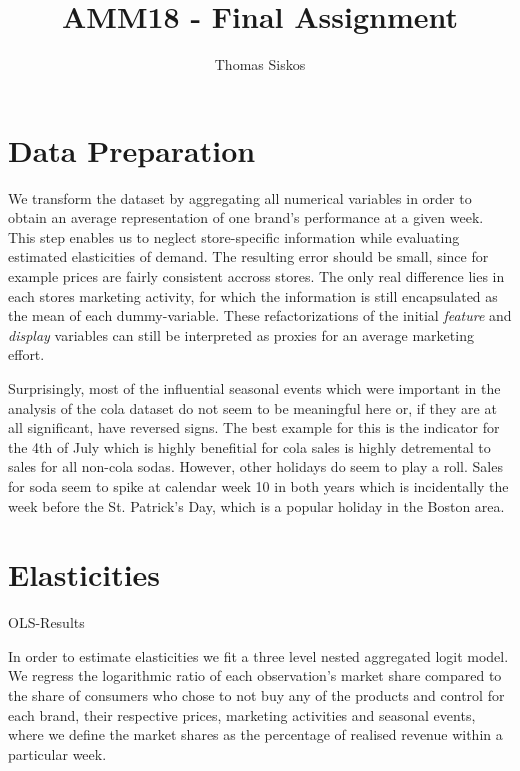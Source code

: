 \documentclass[12pt]{article}
\author{Thomas Siskos}
\title{AMM18 - Final Assignment}
\begin{document}
\section{Data Preparation}
We transform the dataset by aggregating all numerical variables in order to obtain an average representation of one brand's performance at a given week. This step enables us to neglect store-specific information while evaluating estimated elasticities of demand. The resulting error should be small, since for example prices are fairly consistent accross stores. The only real difference lies in each stores marketing activity, for which the information is still encapsulated as the mean of each dummy-variable. These refactorizations of the initial \textit{feature} and \textit{display} variables can still be interpreted as proxies for an average marketing effort.

Surprisingly, most of the influential seasonal events which were important in the analysis of the cola dataset do not seem to be meaningful here or, if they are at all significant, have reversed signs. The best example for this is the indicator for the 4th of July which is highly benefitial for cola sales is highly detremental to sales for all non-cola sodas. However, other holidays do seem to play a roll. Sales for soda seem to spike at calendar week 10 in both years which is incidentally the week before the St. Patrick's Day, which is a popular holiday in the Boston area.

\section{Elasticities}

\begin{table}
\caption{OLS-Results}
\label{ols}
\scriptsize
\centering

\end{table}

In order to estimate elasticities we fit a three level nested aggregated logit model. We regress the logarithmic ratio of each observation's market share compared to the share of consumers who chose to not buy any of the products and control for each brand, their respective prices, marketing activities and seasonal events, where we define the market shares as the percentage of realised revenue within a particular week.
\end{document}

